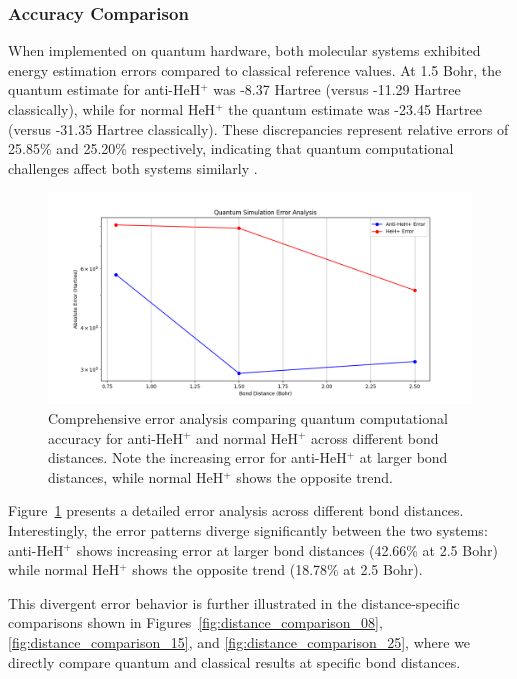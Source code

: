 \documentclass[10pt,twocolumn,a4paper]{article}
\begin{document}
\subsubsection{Accuracy Comparison}
When implemented on quantum hardware, both molecular systems exhibited energy estimation errors compared to classical reference values. At 1.5 Bohr, the quantum estimate for anti-HeH$^+$ was -8.37 Hartree (versus -11.29 Hartree classically), while for normal HeH$^+$ the quantum estimate was -23.45 Hartree (versus -31.35 Hartree classically). These discrepancies represent relative errors of 25.85\% and 25.20\% respectively, indicating that quantum computational challenges affect both systems similarly \cite{sharma2020noise}.

\begin{figure}[t!]
    \centering
    \includegraphics[width=\columnwidth]{graphs/quantum_error_analysis.png}
    \caption{Comprehensive error analysis comparing quantum computational accuracy for anti-HeH$^+$ and normal HeH$^+$ across different bond distances. Note the increasing error for anti-HeH$^+$ at larger bond distances, while normal HeH$^+$ shows the opposite trend.}
    \label{fig:error_analysis}
\end{figure}

Figure~\ref{fig:error_analysis} presents a detailed error analysis across different bond distances. Interestingly, the error patterns diverge significantly between the two systems: anti-HeH$^+$ shows increasing error at larger bond distances (42.66\% at 2.5 Bohr) while normal HeH$^+$ shows the opposite trend (18.78\% at 2.5 Bohr).

This divergent error behavior is further illustrated in the distance-specific comparisons shown in Figures~\ref{fig:distance_comparison_08}, \ref{fig:distance_comparison_15}, and \ref{fig:distance_comparison_25}, where we directly compare quantum and classical results at specific bond distances.
\end{document}
